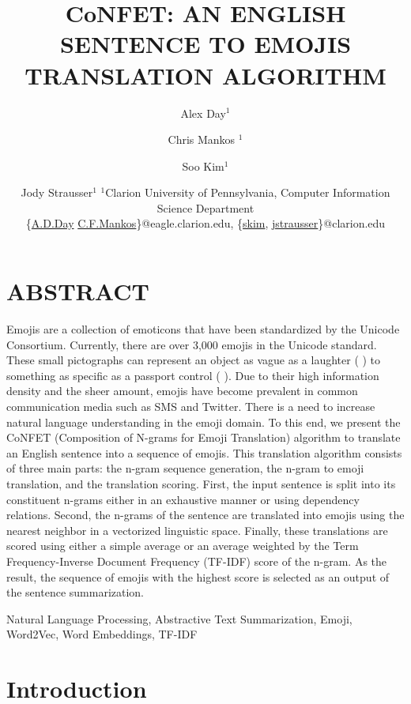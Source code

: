 \documentclass{article}[10]
\author{Alex Day$^1$ \and Chris Mankos $^{1}$ \and Soo Kim$^1$ \and Jody
  Strausser$^{1}$ \affiliations%
  $^1$Clarion University of Pennsylvania, Computer Information Science Department\\
  \emails%
  \{\href{mailto:A.D.Day@eagle.clarion.edu}{A.D.Day}
  \href{mailto:C.F.Mankos@eagle.clarion.edu}{C.F.Mankos}\}@eagle.clarion.edu,
  \{\href{mailto:skim@clarion.edu}{skim},
  \href{mailto:jstrausser@clarion.edu}{jstrausser}\}@clarion.edu }
\newcommand*{\img}[1]{%
  \raisebox{-.3\baselineskip}{%
    \texttt{[image: \#1]}%
  }%
} \title{{CoNFET:} AN ENGLISH SENTENCE TO EMOJIS TRANSLATION ALGORITHM}
\begin{document}
\maketitle

\titleformat{\section}{\normalfont\fontsize{10}{0}\bfseries}{\thesection}{1em}{}

\setlength{\parskip}{0em}
\section*{ABSTRACT}
\setlength{\parskip}{1em} Emojis are a collection of emoticons that have been
standardized by the Unicode Consortium. Currently, there are over 3,000 emojis
in the Unicode standard. These small pictographs can represent an object as
vague as a laughter (\img{emojis/1f923.png}) to something as specific as a
passport control (\img{emojis/1f6c2.png}). Due to their high information density
and the sheer amount, emojis have become prevalent in common communication media
such as SMS and Twitter. There is a need to increase natural language
understanding in the emoji domain. To this end, we present the CoNFET
(Composition of N-grams for Emoji Translation) algorithm to translate an English
sentence into a sequence of emojis. This translation algorithm consists of three
main parts: the n-gram sequence generation, the n-gram to emoji translation, and
the translation scoring. First, the input sentence is split into its constituent
n-grams either in an exhaustive manner or using dependency relations. Second,
the n-grams of the sentence are translated into emojis using the nearest
neighbor in a vectorized linguistic space. Finally, these translations are
scored using either a simple average or an average weighted by the Term
Frequency-Inverse Document Frequency (TF-IDF) score of the n-gram. As the
result, the sequence of emojis with the highest score is selected as an output
of the sentence summarization.

\begin{keywords}
  Natural Language Processing, Abstractive Text Summarization, Emoji, Word2Vec,
  Word Embeddings, TF-IDF
\end{keywords}

\section{Introduction}
\end{document}

